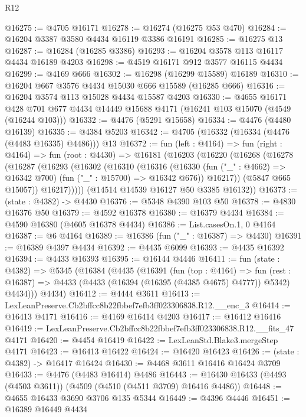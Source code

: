 \begin{lexlean}{R12}
\begin{coremodule}
@16275 := @4705 @16171
@16278 := @16274 (@16275 @53 @470)
@16284 := @16204 @3387 @3580 @4434 @16119 @3386 @16191
@16285 := @16275 @13
@16287 := @16284 (@16285 @3386)
@16293 := @16204 @3578 @113 @16117 @4434 @16189 @4203
@16298 := @4519 @16171 @912 @3577 @16115 @4434
@16299 := @4169 @666
@16302 := @16298 (@16299 @15589) @16189
@16310 := @16204 @667 @3576 @4434 @15030 @666 @15589 (@16285 @666)
@16316 := @16204 @3574 @113 @15028 @4434 @15587 @4203
@16330 := @4655
    @16171
    @428
    @701
    @677
    @4434
    @14449
    @15688
    @4171
    (@16241 @103 @15070 (@4549 (@16244 @103)))
@16332 := @4476 (@5291 @15658)
@16334 := @4476 (@4480 @16139)
@16335 := @4384 @5203
@16342 := @4705 (@16332 (@16334 (@4476 (@4483 @16335) @4486))) @13
@16372 := fun (left : @4164) =>
  fun (right : @4164) =>
  fun (root : @4430) =>
  @16181
    (@16203
      (@16220
        (@16268
          (@16278
            (@16287
              (@16293
                (@16302
                  (@16310
                    (@16316
                      (@16330
                        (fun ("_" : @4662) => @16342 @700)
                        (fun ("_" : @15700) => @16342 @676))
                      @16217))
                  (@5847 @665 @15057))
                @16217)))))
      (@14514 @14539 @16127 @50 @3385 @16132))
@16373 := (state : @4382) -> @4430
@16376 := @5348 @4390 @103 @50
@16378 := @4830 @16376 @50
@16379 := @4592 @16378
@16380 := @16379 @4434
@16384 := @4590 @16380 (@4605 @16378 @4434)
@16386 := List.casesOn.{1, 0} @4164
@16387 := @6 @4164
@16389 := @16386 (fun ("_" : @16387) => @4430)
@16391 := @16389 @4397 @4434
@16392 := @4435 @6099
@16393 := @4435 @16392
@16394 := @4433 @16393
@16395 := @16144 @4446
@16411 := fun (state : @4382) =>
  @5345
    (@16384
      (@4435
        (@16391
          (fun (top : @4164) =>
          fun (rest : @16387) => @4433 (@4433 (@16394 (@16395 (@4385 @4675) @4777)) @5342) @4434)))
      @4434)
@16412 := @4444 @3611
@16413 := LexLeanPreserve.Cb2bffcc8b22fbbef7efb3ff023306838.R12.__enc_3
@16414 := @16413 @4171
@16416 := @4169 @16414 @4203
@16417 := @16412 @16416
@16419 := LexLeanPreserve.Cb2bffcc8b22fbbef7efb3ff023306838.R12.__fits_47 @4171
@16420 := @4454 @16419
@16422 := LexLeanStd.Blake3.mergeStep @4171
@16423 := @16413 @16422
@16424 := @16420 @16423
@16426 := (state : @4382) -> @16417 @16424
@16430 := @4468 @3611 @16416 @16424 @3709
@16433 := @4476 (@4483 @16414) @4486
@16443 := @16430 @16433 (@4493 (@4503 @3611)) (@4509 (@4510 (@4511 @3709) @16416 @4486))
@16448 := @4655 @16433 @3690 @3706 @135 @5344
@16449 := @4396 @4446
@16451 := @16389 @16449 @4434

\end{coremodule}
\end{lexlean}
